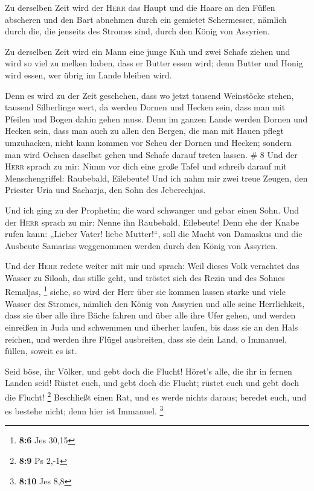  Zu derselben Zeit wird der \textsc{Herr} das Haupt und
die Haare an den Füßen abscheren und den Bart abnehmen durch ein
gemietet Schermesser, nämlich durch die, die jenseits des Stromes sind,
durch den König von Assyrien.

 Zu derselben Zeit wird ein Mann eine junge Kuh und zwei
Schafe ziehen  und wird so viel zu melken haben, dass er
Butter essen wird; denn Butter und Honig wird essen, wer übrig im Lande
bleiben wird.

 Denn es wird zu der Zeit geschehen, dass wo jetzt
tausend Weinstöcke stehen, tausend Silberlinge wert, da werden Dornen
und Hecken sein,  dass man mit Pfeilen und Bogen dahin
gehen muss. Denn im ganzen Lande werden Dornen und Hecken sein,
 dass man auch zu allen den Bergen, die man mit Hauen
pflegt umzuhacken, nicht kann kommen vor Scheu der Dornen und Hecken;
sondern man wird Ochsen daselbst gehen und Schafe darauf treten lassen.
\# 8  Und der \textsc{Herr} sprach zu mir: Nimm vor dich
eine große Tafel und schreib darauf mit Menschengriffel: Raubebald,
Eilebeute!  Und ich nahm mir zwei treue Zeugen, den
Priester Uria und Sacharja, den Sohn des Jeberechjas.

 Und ich ging zu der Prophetin; die ward schwanger und
gebar einen Sohn. Und der \textsc{Herr} sprach zu mir: Nenne ihn
Raubebald, Eilebeute!  Denn ehe der Knabe rufen kann:
„Lieber Vater! liebe Mutter!{}``, soll die Macht von Damaskus und die
Ausbeute Samarias weggenommen werden durch den König von Assyrien.

 Und der \textsc{Herr} redete weiter mit mir und sprach:
 Weil dieses Volk verachtet das Wasser zu Siloah, das
stille geht, und tröstet sich des Rezin und des Sohnes Remaljas,
\footnote{\textbf{8:6} Jes 30,15}  siehe, so wird der Herr
über sie kommen lassen starke und viele Wasser des Stromes, nämlich den
König von Assyrien und alle seine Herrlichkeit, dass sie über alle ihre
Bäche fahren und über alle ihre Ufer gehen,  und werden
einreißen in Juda und schwemmen und überher laufen, bis dass sie an den
Hals reichen, und werden ihre Flügel ausbreiten, dass sie dein Land, o
Immanuel, füllen, soweit es ist.

 Seid böse, ihr Völker, und gebt doch die Flucht! Höret's
alle, die ihr in fernen Landen seid! Rüstet euch, und gebt doch die
Flucht; rüstet euch und gebt doch die Flucht! \footnote{\textbf{8:9} Ps
  2,-1}  Beschließt einen Rat, und es werde nichts
daraus; beredet euch, und es bestehe nicht; denn hier ist Immanuel.
\footnote{\textbf{8:10} Jes 8,8}

